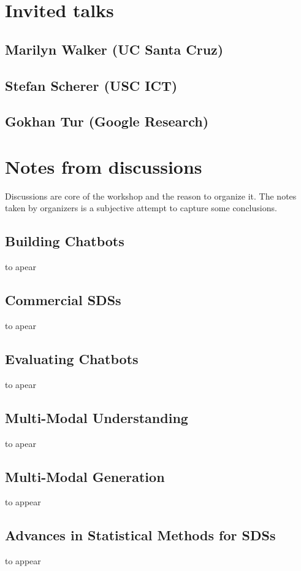 \documentclass[12pt]{article}
\begin{document}

\tableofcontents
\pagebreak


\section{Invited talks}
\subsection{Marilyn Walker (UC Santa Cruz)}
\subsection{Stefan Scherer (USC ICT)}
\subsection{Gokhan Tur (Google Research)}

\section{Notes from discussions}
Discussions are core of the workshop and the reason to organize it. 
The notes taken by organizers is a subjective attempt to capture some conclusions.

\subsection{Building Chatbots}
to apear
\subsection{Commercial SDSs}
to apear
\subsection{Evaluating Chatbots}
to apear
\subsection{Multi-Modal Understanding}
to apear
\subsection{Multi-Modal Generation}
to appear
\subsection{Advances in Statistical Methods for SDSs}
to appear
\end{document}
